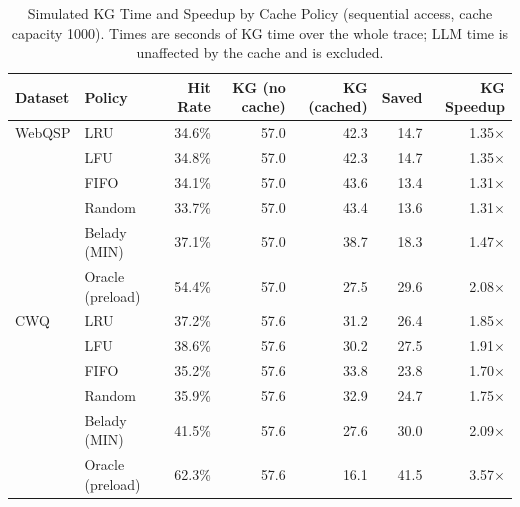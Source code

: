 \begin{table}[htbp]
\centering
\caption{Simulated KG Time and Speedup by Cache Policy (sequential access, cache capacity 1000). Times are seconds of KG time over the whole trace; LLM time is unaffected by the cache and is excluded.}
\label{tab:kg_timing_sequential_1000}
\begin{tabular}{llrrrrr}
\hline
\textbf{Dataset} & \textbf{Policy} & \textbf{Hit Rate} & \textbf{KG (no cache)} & \textbf{KG (cached)} & \textbf{Saved} & \textbf{KG Speedup} \\
\hline
WebQSP   & LRU      & 34.6\% & 57.0 & 42.3 & 14.7 & 1.35$\times$ \\
         & LFU      & 34.8\% & 57.0 & 42.3 & 14.7 & 1.35$\times$ \\
         & FIFO     & 34.1\% & 57.0 & 43.6 & 13.4 & 1.31$\times$ \\
         & Random   & 33.7\% & 57.0 & 43.4 & 13.6 & 1.31$\times$ \\
         & Belady (MIN) & 37.1\% & 57.0 & 38.7 & 18.3 & 1.47$\times$ \\
         & Oracle (preload) & 54.4\% & 57.0 & 27.5 & 29.6 & 2.08$\times$ \\
\hline
CWQ      & LRU      & 37.2\% & 57.6 & 31.2 & 26.4 & 1.85$\times$ \\
         & LFU      & 38.6\% & 57.6 & 30.2 & 27.5 & 1.91$\times$ \\
         & FIFO     & 35.2\% & 57.6 & 33.8 & 23.8 & 1.70$\times$ \\
         & Random   & 35.9\% & 57.6 & 32.9 & 24.7 & 1.75$\times$ \\
         & Belady (MIN) & 41.5\% & 57.6 & 27.6 & 30.0 & 2.09$\times$ \\
         & Oracle (preload) & 62.3\% & 57.6 & 16.1 & 41.5 & 3.57$\times$ \\
\hline
\end{tabular}
\end{table}

